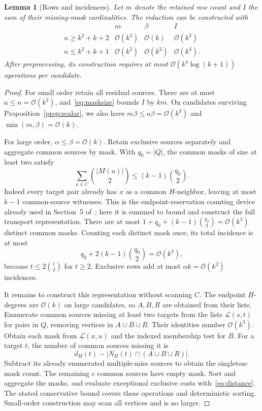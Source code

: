 \documentclass[11pt]{article}
\newtheorem{lemma}[theorem]{Lemma}
\theoremstyle{remark}
\newcommand{\Oh}{\mathcal O}
\newcommand{\NH}{N_H}
\begin{document}
\begin{lemma}[Rows and incidences]\label{lem:incidence}
Let $m$ denote the retained row count and $I$ the sum of their missing-mask cardinalities. The reduction can be constructed with
\[
\begin{array}{c|ccc}
 &m&\beta&I\\\hline
 n\ge k^2+k+2&\Oh(k^3)&\Oh(k)&\Oh(k^3)\\
 n\le k^2+k+1&\Oh(k^2)&\Oh(k^2)&\Oh(k^3).
\end{array}
\]
After preprocessing, its construction requires at most $\Oh(k^4\log(k+1))$ operations per candidate.
\end{lemma}
\begin{proof}
For small order retain all residual sources. There are at most $a\le n=\Oh(k^2)$, and~\eqref{eq:masksize} bounds $I$ by $km$. On candidates surviving Proposition~\ref{prop:scalar}, we also have $m\beta\le a\beta=\Oh(k^3)$ and $\min(m,\beta)=\Oh(k)$.

For large order, $\alpha\le\beta=\Oh(k)$. Retain exclusive sources separately and aggregate common sources by mask. With $q_0=|Q|$, the common masks of size at least two satisfy
\begin{equation}\label{eq:pairbudget}
 \sum_{u\in C}\binom{|M(u)|}{2}\le(k-1)\binom{q_0}{2}.
\end{equation}
Indeed every target pair already has $x$ as a common $H$-neighbor, leaving at most $k-1$ common-source witnesses. This is the endpoint-reservation counting device already used in Section~5 of~\cite{chen}; here it is summed to bound and construct the full transport representation. There are at most $1+q_0+(k-1)\binom{q_0}{2}=\Oh(k^3)$ distinct common masks. Counting each distinct mask once, its total incidence is at most
\[
 q_0+2(k-1)\binom{q_0}{2}=\Oh(k^3),
\]
because $t\le2\binom t2$ for $t\ge2$. Exclusive rows add at most $\alpha k=\Oh(k^2)$ incidences.

It remains to construct this representation without scanning $C$. The endpoint $H$-degrees are $\Oh(k)$ on large candidates, so $A,B,R$ are obtained from their lists. Enumerate common sources missing at least two targets from the lists $\mathcal L(s,t)$ for pairs in $Q$, removing vertices in $A\cup B\cup R$. Their identities number $\Oh(k^3)$. Obtain each mask from $\mathcal L(x,u)$ and the indexed membership test for $B$. For a target $t$, the number of common sources missing it is
\[
 d_H(t)-|\NH(t)\cap(A\cup B\cup R)|.
\]
Subtract its already enumerated multiple-miss sources to obtain the singleton-mask count. The remaining $c$ common sources have empty mask. Sort and aggregate the masks, and evaluate exceptional exclusive costs with~\eqref{eq:distance}. The stated conservative bound covers these operations and deterministic sorting. Small-order construction may scan all vertices and is no larger.
\end{proof}
\end{document}
